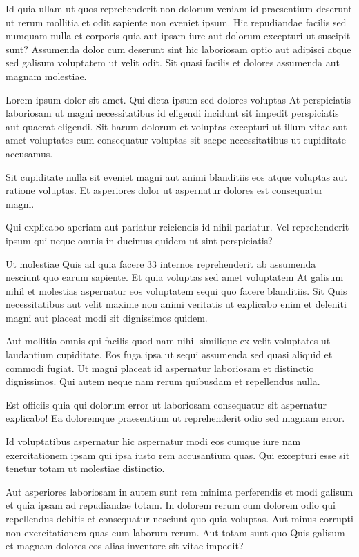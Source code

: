 Id quia ullam ut quos reprehenderit non dolorum veniam id praesentium deserunt ut rerum mollitia et odit sapiente non eveniet ipsum. Hic repudiandae facilis sed numquam nulla et corporis quia aut ipsam iure aut dolorum excepturi ut suscipit sunt? Assumenda dolor cum deserunt sint hic laboriosam optio aut adipisci atque sed galisum voluptatem ut velit odit. Sit quasi facilis et dolores assumenda aut magnam molestiae.

Lorem ipsum dolor sit amet. Qui dicta ipsum sed dolores voluptas At perspiciatis laboriosam ut magni necessitatibus id eligendi incidunt sit impedit perspiciatis aut quaerat eligendi. Sit harum dolorum et voluptas excepturi ut illum vitae aut amet voluptates eum consequatur voluptas sit saepe necessitatibus ut cupiditate accusamus.

Sit cupiditate nulla sit eveniet magni aut animi blanditiis eos atque voluptas aut ratione voluptas. Et asperiores dolor ut aspernatur dolores est consequatur magni.

Qui explicabo aperiam aut pariatur reiciendis id nihil pariatur. Vel reprehenderit ipsum qui neque omnis in ducimus quidem ut sint perspiciatis?

Ut molestiae Quis ad quia facere 33 internos reprehenderit ab assumenda nesciunt quo earum sapiente. Et quia voluptas sed amet voluptatem At galisum nihil et molestias aspernatur eos voluptatem sequi quo facere blanditiis. Sit Quis necessitatibus aut velit maxime non animi veritatis ut explicabo enim et deleniti magni aut placeat modi sit dignissimos quidem.

Aut mollitia omnis qui facilis quod nam nihil similique ex velit voluptates ut laudantium cupiditate. Eos fuga ipsa ut sequi assumenda sed quasi aliquid et commodi fugiat. Ut magni placeat id aspernatur laboriosam et distinctio dignissimos. Qui autem neque nam rerum quibusdam et repellendus nulla.

Est officiis quia qui dolorum error ut laboriosam consequatur sit aspernatur explicabo! Ea doloremque praesentium ut reprehenderit odio sed magnam error.

Id voluptatibus aspernatur hic aspernatur modi eos cumque iure nam exercitationem ipsam qui ipsa iusto rem accusantium quas. Qui excepturi esse sit tenetur totam ut molestiae distinctio.

Aut asperiores laboriosam in autem sunt rem minima perferendis et modi galisum et quia ipsam ad repudiandae totam. In dolorem rerum cum dolorem odio qui repellendus debitis et consequatur nesciunt quo quia voluptas. Aut minus corrupti non exercitationem quas eum laborum rerum. Aut totam sunt quo Quis galisum et magnam dolores eos alias inventore sit vitae impedit?


